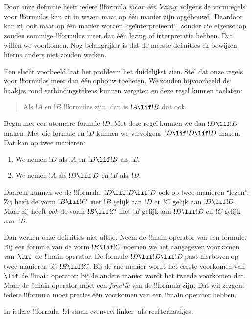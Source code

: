 \documentclass[../../../include/open-logic-section]{subfiles}
\begin{document}


\begin{explain}
Door onze definitie heeft iedere !!{formula} \emph{maar één lezing}:
volgens de vormregels voor !!{formula}s kan zij in wezen maar op één
manier zijn opgebouwd. Daardoor kan zij ook maar op één manier worden
``geïnterpreteerd''. Zonder die eigenschap zouden sommige !!{formula}s
meer dan één lezing of interpretatie hebben. Dat willen we voorkomen.
Nog belangrijker is dat de meeste definities en bewijzen hierna anders
niet zouden werken.

Een slecht voorbeeld laat het probleem het duidelijkst zien. Stel dat
onze regels voor !!{formula}s meer dan één opbouw toelieten. We zouden
bijvoorbeeld de haakjes rond verbindingstekens kunnen vergeten en deze
regel kunnen toelaten:
\begin{quote}
Als $!A$ en $!B$ !!{formula}s zijn, dan is $!A \lif !B$ dat ook.
\end{quote}
Begin met een atomaire formule $!D$. Met deze regel kunnen we dan $!D
\lif !D$ maken. Met die formule en $!D$ kunnen we vervolgens $!D \lif
!D \lif !D$ maken. Dat kan op twee manieren:
\begin{enumerate}
\item We nemen $!D$ als $!A$ en $!D \lif !D$ als $!B$.
\item We nemen $!A$ als $!D \lif !D$ en $!B$ als~$!D$.  
\end{enumerate}
Daarom kunnen we de !!{formula}~$!D \lif !D \lif !D$ ook op twee
manieren ``lezen''. Zij heeft de vorm $!B \lif !C$ met $!B$ gelijk aan
$!D$ en $!C$ gelijk aan $!D \lif !D$. Maar zij heeft \emph{ook} de vorm
$!B \lif !C$ met $!B$ gelijk aan $!D \lif !D$ en $!C$ gelijk aan~$!D$.

Dan werken onze definities niet altijd. Neem de !!{main operator} van
een formule. Bij een formule van de vorm $!B \lif !C$ noemen we het
aangegeven voorkomen van~$\lif$ de !!{main operator}. De formule $!D
\lif !D \lif !D$ past hierboven op twee manieren bij $!B \lif !C$.
Bij de ene manier wordt het eerste voorkomen van $\lif$ de !!{main
operator}; bij de andere manier wordt het tweede voorkomen dat. Maar
de !!{main operator} moet een \emph{functie} van de !!{formula} zijn.
Dat wil zeggen: iedere !!{formula} moet precies één voorkomen van een
!!{main operator} hebben.
\end{explain}

\begin{lem}
In iedere !!{formula}~$!A$ staan evenveel linker- als rechterhaakjes.
\end{lem}
\end{document}
